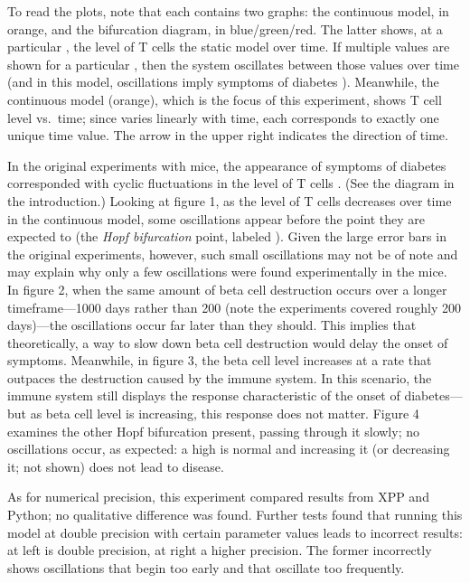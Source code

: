 To read the plots, note that each contains two graphs: the continuous model,
in orange, and the bifurcation diagram, in blue/green/red. The latter shows,
at a particular , the level of T cells the static model
 over time. If multiple values are shown for a
particular , then the system oscillates between those values
over time (and in this model, oscillations imply symptoms of diabetes
\cite{Mahaffy2007}). Meanwhile, the continuous model (orange), which is the
focus of this experiment, shows T cell level vs.\ time; since
 varies linearly with time, each  corresponds
to exactly one unique time value. The arrow in the upper right indicates the
direction of time.

In the original experiments with mice, the appearance of symptoms of
diabetes corresponded with cyclic fluctuations in the level of T cells
\cite{Trudeau2003}. (See the diagram in the introduction.)  Looking at
figure 1, as the level of T cells decreases over time in the continuous
model, some oscillations appear before the point they are expected to (the
{\em Hopf bifurcation} point, labeled ). Given the large error
bars in the original experiments, however, such small oscillations may not
be of note and may explain why only a few oscillations were found
experimentally in the mice. In figure 2, when the same amount of beta cell
destruction occurs over a longer timeframe—1000 days rather than 200 (note
the experiments covered roughly 200 days)—the oscillations occur far later
than they should. This implies that theoretically, a way to slow down beta
cell destruction would delay the onset of symptoms. Meanwhile, in figure 3,
the beta cell level increases at a rate that outpaces the destruction caused
by the immune system. In this scenario, the immune system still displays the
response characteristic of the onset of diabetes—but as beta cell level is
increasing, this response does not matter. Figure 4 examines the other Hopf
bifurcation present, passing through it slowly; no oscillations occur, as
expected: a high  is normal \cite{Mahaffy2007} and increasing
it (or decreasing it; not shown) does not lead to disease.


As for numerical precision, this experiment compared results from XPP and
Python; no qualitative difference was found. Further tests found that
running this model at double precision with certain parameter values leads
to incorrect results: at left is double precision, at right a higher
precision. The former incorrectly shows oscillations that begin too early
and that oscillate too frequently.
